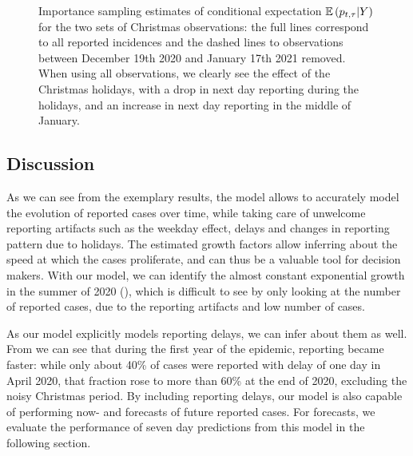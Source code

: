 \begin{figure}
    \resizebox{\textwidth}{!}{%
    }
    \caption{Importance sampling estimates of conditional expectation $\mathbb E \left( p_{t, \tau} | Y \right)$ for the two sets of Christmas observations: the full lines correspond to all reported incidences and the dashed lines to observations between December 19th 2020 and January 17th 2021 removed. When using all observations, we clearly see the effect of the Christmas holidays, with a drop in next day reporting during the holidays, and an increase in next day reporting in the middle of January.}
    \label{fig:christmas_delay_probs}
\end{figure}

\subsection{Discussion}
As we can see from the exemplary results, the model allows to accurately model the evolution of reported cases over time, while taking care of unwelcome reporting artifacts such as the weekday effect, delays and changes in reporting pattern due to holidays. 
The estimated growth factors allow inferring about the speed at which the cases proliferate, and can thus be a valuable tool for decision makers. With our model, we can identify the almost constant exponential growth in the summer of 2020 (), which is difficult to see by only looking at the number of reported cases, due to the reporting artifacts and low number of cases. 

As our model explicitly models reporting delays, we can infer about them as well. From  we can see that during the first year of the epidemic, reporting became faster: while only about 40\% of cases were reported with delay of one day in April 2020, that fraction rose to more than 60\% at the end of 2020, excluding the noisy Christmas period. By including reporting delays, our model is also capable of performing now- and forecasts of future reported cases. For forecasts, we evaluate the performance of seven day predictions from this model in the following section.

